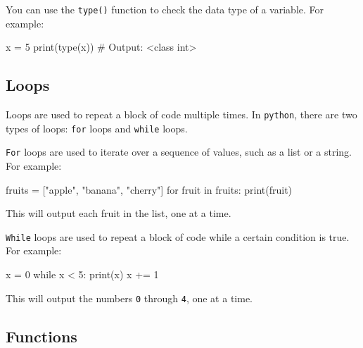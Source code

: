 \documentclass[
  letterpaper,
]{article}
\newenvironment{Shaded}{\begin{snugshade}}{\end{snugshade}}
\newcommand{\BuiltInTok}[1]{\textcolor[rgb]{0.00,0.23,0.31}{#1}}
\newcommand{\CommentTok}[1]{\textcolor[rgb]{0.37,0.37,0.37}{#1}}
\newcommand{\ControlFlowTok}[1]{\textcolor[rgb]{0.00,0.23,0.31}{#1}}
\newcommand{\DecValTok}[1]{\textcolor[rgb]{0.68,0.00,0.00}{#1}}
\newcommand{\KeywordTok}[1]{\textcolor[rgb]{0.00,0.23,0.31}{#1}}
\newcommand{\NormalTok}[1]{\textcolor[rgb]{0.00,0.23,0.31}{#1}}
\newcommand{\OperatorTok}[1]{\textcolor[rgb]{0.37,0.37,0.37}{#1}}
\newcommand{\StringTok}[1]{\textcolor[rgb]{0.13,0.47,0.30}{#1}}
\begin{document}
You can use the \texttt{type()} function to check the data type of a
variable. For example:

\begin{Shaded}
\begin{Highlighting}[]
\NormalTok{x }\OperatorTok{=} \DecValTok{5}
\BuiltInTok{print}\NormalTok{(}\BuiltInTok{type}\NormalTok{(x)) }\CommentTok{\# Output: \textless{}class \textquotesingle{}int\textquotesingle{}\textgreater{}}
\end{Highlighting}
\end{Shaded}

\hypertarget{loops}{%
\subsection{Loops}\label{loops}}

Loops are used to repeat a block of code multiple times. In
\texttt{python}, there are two types of loops: \texttt{for} loops and
\texttt{while} loops.

\texttt{For} loops are used to iterate over a sequence of values, such
as a list or a string. For example:

\begin{Shaded}
\begin{Highlighting}[]
\NormalTok{fruits }\OperatorTok{=}\NormalTok{ [}\StringTok{"apple"}\NormalTok{, }\StringTok{"banana"}\NormalTok{, }\StringTok{"cherry"}\NormalTok{]}
\ControlFlowTok{for}\NormalTok{ fruit }\KeywordTok{in}\NormalTok{ fruits:}
  \BuiltInTok{print}\NormalTok{(fruit)}
\end{Highlighting}
\end{Shaded}

This will output each fruit in the list, one at a time.

\texttt{While} loops are used to repeat a block of code while a certain
condition is true. For example:

\begin{Shaded}
\begin{Highlighting}[]
\NormalTok{x }\OperatorTok{=} \DecValTok{0}
\ControlFlowTok{while}\NormalTok{ x }\OperatorTok{\textless{}} \DecValTok{5}\NormalTok{:}
  \BuiltInTok{print}\NormalTok{(x)}
\NormalTok{  x }\OperatorTok{+=} \DecValTok{1}
\end{Highlighting}
\end{Shaded}

This will output the numbers \texttt{0} through \texttt{4}, one at a
time.

\hypertarget{functions}{%
\subsection{Functions}\label{functions}}
\end{document}
